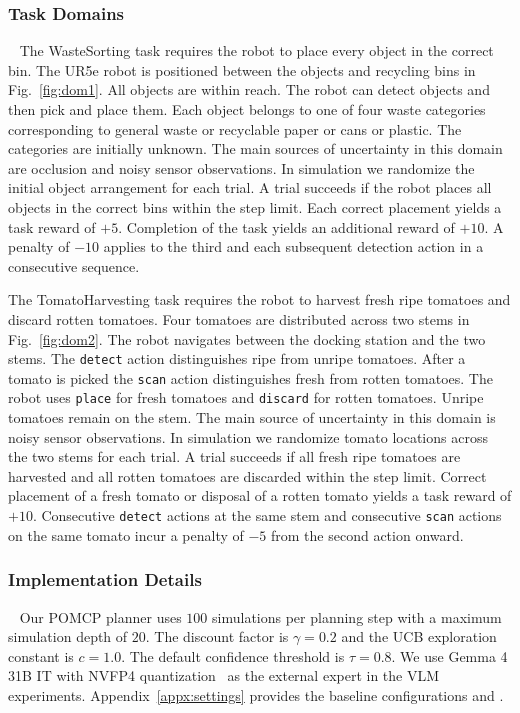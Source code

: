 \subsubsection{Task Domains}~\label{exp:setup_domains}
The WasteSorting task requires the robot to place every object in the correct bin. The UR5e robot is positioned between the objects and recycling bins in Fig.~\ref{fig:dom1}. All objects are within reach. The robot can detect objects and then pick and place them. Each object belongs to one of four waste categories corresponding to general waste or recyclable paper or cans or plastic. The categories are initially unknown. The main sources of uncertainty in this domain are occlusion and noisy sensor observations. In simulation we randomize the initial object arrangement for each trial. A trial succeeds if the robot places all objects in the correct bins within the step limit. Each correct placement yields a task reward of $+5$. Completion of the task yields an additional reward of $+10$. A penalty of $-10$ applies to the third and each subsequent detection action in a consecutive sequence.

The TomatoHarvesting task requires the robot to harvest fresh ripe tomatoes and discard rotten tomatoes. Four tomatoes are distributed across two stems in Fig.~\ref{fig:dom2}. The robot navigates between the docking station and the two stems. The \texttt{detect} action distinguishes ripe from unripe tomatoes. After a tomato is picked the \texttt{scan} action distinguishes fresh from rotten tomatoes. The robot uses \texttt{place} for fresh tomatoes and \texttt{discard} for rotten tomatoes. Unripe tomatoes remain on the stem. The main source of uncertainty in this domain is noisy sensor observations. In simulation we randomize tomato locations across the two stems for each trial. A trial succeeds if all fresh ripe tomatoes are harvested and all rotten tomatoes are discarded within the step limit. Correct placement of a fresh tomato or disposal of a rotten tomato yields a task reward of $+10$. Consecutive \texttt{detect} actions at the same stem and consecutive \texttt{scan} actions on the same tomato incur a penalty of $-5$ from the second action onward.


\subsubsection{Implementation Details}~\label{exp:details}
Our POMCP planner uses $100$ simulations per planning step with a maximum simulation depth of $20$. The discount factor is $\gamma=0.2$ and the UCB exploration constant is $c=1.0$. The default confidence threshold is $\tau=0.8$. We use Gemma 4 31B IT with NVFP4 quantization~\cite{gemmateam2026gemma4} as the external expert in the VLM experiments. Appendix~\ref{appx:settings} provides the  baseline configurations\cp{,} and .

